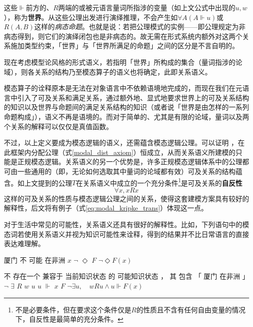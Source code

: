 \documentclass[fontset=ubuntu]{ctexart}
\begin{document}
			这些\(\Vdash\)前方的、\(R\)两端的或被元语言量词所指涉的变量（如上文公式中出现的\(u,w\)），称为\textbf{世界}。从这些公理出发进行演绎推理，不会产生如\(\forall A(A\Vdash u)\)或\(R(A,B)\)这样的\textit{病态命题}。也就是说：若把公理模式的实例——即公理规定为非病态得到，则它们的演绎闭包也是非病态的。故无需在形式系统内额外对这两个关系施加类型约束，「世界」与「世界所满足的命题」之间的区分是不言自明的。

			现在考虑模型论风格的形式语义，若指明「世界」所构成的集合（量词指涉的论域），则各关系的结构乃至模态算子的语义也将确定，此即关系语义。

			模态算子的诠释原本是无法在对象语言中不依赖语境地完成的，而现在我们在元语言中引入了可及关系和满足关系，通过额外地、显式地要求世界上的可及关系结构的知识以及世界与命题间的满足关系结构的知识（或者说「世界是由怎样的一系列命题构成」），语义不再是语境的。而对于简单的、尤其是有限的论域，量词以及两个关系的解释可以仅仅是真值函数。

			不过，以上定义要成为模态逻辑的语义，还需蕴含模态逻辑公理。可以证明%
			，在此框架内分配公理（式\ref{modal_dist_axiom}）恒成立，从而关系语义所建模的只能是正规模态逻辑。关系语义的另一个优势是，许多正规模态逻辑体系中的公理都可由一些通用的（即，无论如何选取其中量词的论域都有效）可及关系的结构蕴含。如上文提到的公理\(T\)在关系语义中成立的一个充分条件\footnote{不是必要条件，但在要求这个条件仅是\(R\)的性质且不含有任何自由变量的情况下，自反性是最简单的充分条件。}是可及关系的\textbf{自反性}
			\begin{equation}
				\forall x, xRx
			\end{equation}
			这样的可及关系的性质与模态逻辑公理之间的关系，使得这套建模方案具有较好的解释性，后文将有例子（式\ref{eq:modal_kripke_trans}）体现这一点。

			对于生活中常见的可能性，关系语义还具有很好的解释性。比如，下列语句中的模态词若使用关系语义并视为知识可能性来诠释，得到的结果并不比日常语言的直接表达难理解。
			
			\begin{covexamples}
				\item 
					\gll 厦门 不 可能 在非洲
						\(x\) \(\lnot\) \(\Diamond\) \(F\)
					\glt \(\lnot\Diamond F(x)\)
					\glend
				\item 
					\gll 不 存在一个 兼容于 当前知识状态 的 可能知识状态 ， 其 包含 「 厦门 在非洲 」
						\(\lnot\) \(\exists\) \(R\) \(w\) {} \(u\) {} \(u\) \(\Vdash\) {} \(x\) \(F\) {}
					\glt \(\lnot\exists u,\quad wRu\land u\Vdash F(x)\)
					\glend
			\end{covexamples}
			
\end{document}
